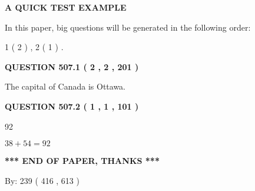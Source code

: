 \documentclass[12pt]{article}
\begin{document}
   
\vspace{0.2in}
   
   
   
   
   
   
 \vspace{0.2in}
{\LARGE {\textbf{ A QUICK TEST EXAMPLE}}}
   
   
   
\vspace{0.2in}
   
In this paper, big questions will be generated in the following order: 
   
   
   1 ( 2 )
 ,
   2 ( 1 )
 .
  
\vspace{0.2in}
  
{\textbf{\Large{QUESTION
507.1 
 ( 2 , 2 , 201 )
}}}
  
  
 
 
\noindent{}
 
 
The capital of Canada is Ottawa.
 
 
 
 
  
\vspace{0.2in}
  
{\textbf{\Large{QUESTION
507.2 
 ( 1 , 1 , 101 )
}}}
  
  
 
 
\noindent{}

92
 
 
 
 
\noindent{}

$ %
38 +  %
54=   %
92$
 
 
   
   
 \vspace{0.2in}
 
   
   
   
   
\vspace{1.0in} 
{\textbf{\large{ *** END OF PAPER, THANKS *** }}} 
   
   
\hspace{1.0in} By: 
 239 ( 416 ,  613 )
   
   
   
\end{document}
